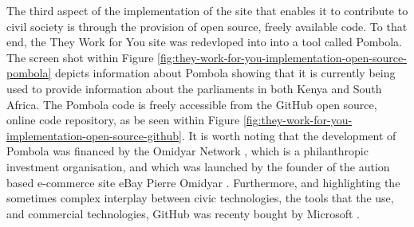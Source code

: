 The third aspect of the implementation of the site that enables it to contribute to civil society is through the provision of open source, freely available code.
To that end, the They Work for You site was redevloped into into a tool called Pombola.
The screen shot within Figure \ref{fig:they-work-for-you-implementation-open-source-pombola} depicts information about Pombola showing that it is currently being used to provide information about the parliaments in both Kenya and South Africa.
The Pombola code \cite{mysociety-github} is freely accessible from the GitHub \cite{github} open source, online code repository, as be seen within Figure \ref{fig:they-work-for-you-implementation-open-source-github}.
It is worth noting that the development of Pombola was financed by the Omidyar Network \cite{omidyar-network}, which is a philanthropic investment organisation, and which was launched by the founder of the aution based e-commerce site eBay \cite{ebay} Pierre Omidyar \cite{pierre-omidyar}.
Furthermore, and highlighting the sometimes complex interplay between civic technologies, the tools that the use, and commercial technologies, GitHub was recenty bought by Microsoft \cite{microsoft-buys-github}.